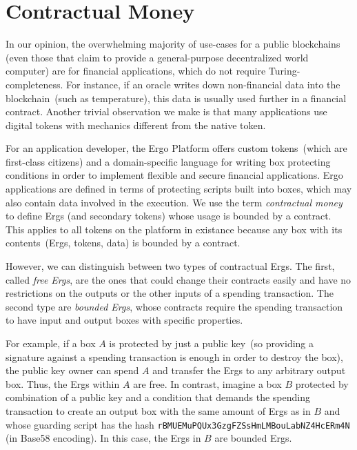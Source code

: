

\section{Contractual Money}
    \label{sec:contractual}

 In our opinion, the overwhelming majority of use-cases for a public blockchains (even those that claim to provide a general-purpose decentralized world computer) are for financial applications, which do not require Turing-completeness. For instance, if an oracle writes down non-financial data into the blockchain~(such as temperature), this data is usually used further in a financial
 contract. Another trivial observation we make is that many applications use digital tokens with mechanics different from the native token.

For an application developer, the Ergo Platform offers custom tokens~(which are first-class citizens) and a domain-specific language for writing box protecting
 conditions in order to implement flexible and secure financial applications.
 Ergo applications are defined in terms of protecting scripts built into boxes, which may also contain data involved in the execution.
 We use the term {\em contractual money} to define Ergs (and secondary tokens) whose usage is bounded by a contract. This applies to all tokens on the platform in existance because any box with its contents~(Ergs, tokens, data) is bounded by a contract.
 
 However, we can distinguish between two types of contractual Ergs. The first, called {\em free Ergs}, are the ones that could change their contracts easily and have no restrictions on the outputs or the other inputs of a spending transaction. The second type are {\em bounded Ergs}, whose contracts require the spending transaction to have input and output boxes with specific properties. 
 
 For example, if a box $A$ is protected by just a public key~(so providing a signature against a spending transaction is enough in order to destroy the box), the public key owner can spend $A$ and transfer the Ergs to any arbitrary output box. Thus, the Ergs within $A$ are free. 
In contrast, imagine a box $B$ protected by combination of a public key and a condition that demands the spending transaction to create an output box with the same amount of Ergs as in $B$ and whose guarding script has the hash \texttt{rBMUEMuPQUx3GzgFZSsHmLMBouLabNZ4HcERm4N} (in Base58 encoding). In this case, the Ergs in $B$ are bounded Ergs.
 
